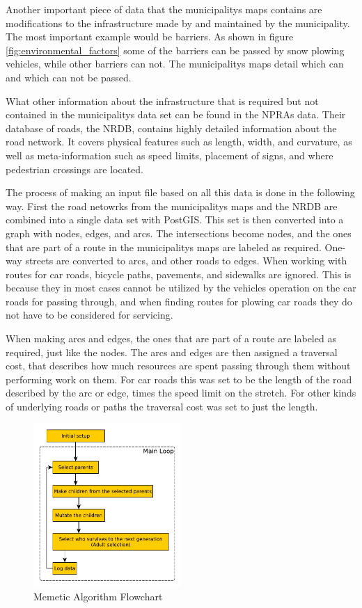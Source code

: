 Another important piece of data that the municipalitys maps contains are modifications to the infrastructure made by and maintained by the municipality. The most important example would be barriers. As shown in figure \ref{fig:environmental_factors} some of the barriers can be passed by snow plowing vehicles, while other barriers can not. The municipalitys maps detail which can and which can not be passed.

What other information about the infrastructure that is required but not contained in the municipalitys data set can be found in the NPRAs data. Their database of roads, the NRDB, contains highly detailed information about the road network. It covers physical features such as length, width, and curvature, as well as meta-information such as speed limits, placement of signs, and where pedestrian crossings are located.

The process of making an input file based on all this data is done in the following way. First the road netowrks from the municipalitys maps and the NRDB are combined into a single data set with PostGIS. This set is then converted into a graph with nodes, edges, and arcs. The intersections become nodes, and the ones that are part of a route in the municipalitys maps are labeled as required. One-way streets are converted to arcs, and other roads to edges. When working with routes for car roads, bicycle paths, pavements, and sidewalks are ignored. This is because they in most cases cannot be utilized by the vehicles operation on the car roads for passing through, and when finding routes for plowing car roads they do not have to be considered for servicing.

When making arcs and edges, the ones that are part of a route are labeled as required, just like the nodes. The arcs and edges are then assigned a traversal cost, that describes how much resources are spent passing through them without performing work on them. For car roads this was set to be the length of the road described by the arc or edge, times the speed limit on the stretch. For other kinds of underlying roads or paths the traversal cost was set to just the length.

\begin{figure}
	\begin{center}
		\includegraphics[width=0.5\textwidth]{figures/Architecture/MA_flowchart.pdf}
	\end{center}
	\caption{Memetic Algorithm Flowchart}
	\label{fig:ma_flowchart}
\end{figure}

